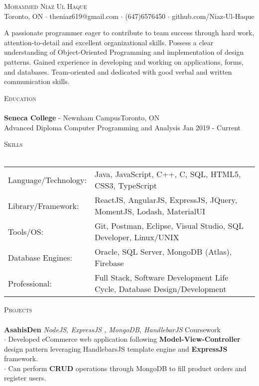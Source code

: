 \documentclass[a4paper]{article}
\newcommand{\lineunder} {
    \vspace*{-8pt} \\
    \hspace*{-18pt} \hrulefill \\
}
\newcommand{\header} [1] {
    {\hspace*{-18pt}\vspace*{6pt} \textsc{#1}}
    \vspace*{-6pt} \lineunder
}
\begin{document}
\vspace*{-40pt}

    

\vspace*{-10pt}
\begin{center}
	{\Huge \scshape {Mohammed Niaz Ul Haque}}\\
	Toronto, ON $\cdot$ theniaz619@gmail.com $\cdot$ (647)6576450 $\cdot$ github.com/Niaz-Ul-Haque\\
\end{center}

\text A passionate programmer eager to contribute to team success through hard work, attention-to-detail and excellent organizational skills. Possess a clear understanding of Object-Oriented Programming and implementation of design patterns. Gained experience in developing and working on applications, forms, and databases. Team-oriented and dedicated with good verbal and written communication skills.\\
\vspace{2mm}
\header{Education}
\textbf{Seneca College} - Newnham Campus\hfill Toronto, ON\\
{Advanced Diploma} Computer Programming and Analysis \hfill Jan 2019 - Current\\
\vspace{2mm}
\header{Skills}\vspace{1mm}
\begin{tabular}{ l l  }
	Language/Technology: & Java, JavaScript, C++, C, SQL, HTML5, CSS3, TypeScript  \\
	Library/Framework:   & ReactJS, AngularJS, ExpressJS, JQuery, MomentJS, Lodash, MaterialUI \\
	Tools/OS:               & Git, Postman, Eclipse, Visual Studio, SQL Developer, Linux/UNIX  \\
	Database Engines:      & Oracle, SQL Server, MongoDB (Atlas), Firebase                            \\
	Professional:      & Full Stack, Software Development Life Cycle, Database Design/Development 
                            \\
\end{tabular}
\vspace{0.3mm}

\header{Projects}\vspace{0.3mm}
{\textbf{AsahisDen}} {\sl NodeJS, ExpressJS , MongoDB, HandlebarJS} \hfill Coursework\\
$\cdot$ Developed eCommerce web application following {\textbf{Model-View-Controller}} design pattern leveraging HandlebarsJS template engine and {\textbf{ExpressJS}} framework.\\
$\cdot$ Can perform {\textbf{CRUD}} operations through MongoDB to fill product orders and register users.\\
\vspace*{2mm}
\end{document}
